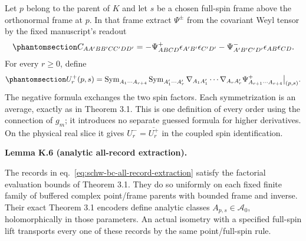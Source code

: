 \documentclass[
  english,
  11pt,
  reqno]{amsart}
\makeatletter
\newcommand{\pandocstatementheading}[1]{%
  \par\addpenalty{\@beginparpenalty}%
  \addvspace{.5\baselineskip plus .2\baselineskip minus .2\baselineskip}%
  {\normalfont\bfseries #1\par}%
  \nobreak\@afterindenttrue\@afterheading
}
\makeatother
\begin{document}
Let \(p\) belong to the parent of \(K\) and let \(s\) be a chosen
full-spin frame above the orthonormal frame at \(p\). In that frame
extract \(\Psi^\pm\) from the covariant Weyl tensor by the fixed
manuscript's readout
\begin{equation}\protect\phantomsection\label{eq:schw-bc-spin-readout}{
 C_{AA'BB'CC'DD'}
 =-\Psi^+_{ABCD}\epsilon_{A'B'}\epsilon_{C'D'}
  -\Psi^-_{A'B'C'D'}\epsilon_{AB}\epsilon_{CD}.
}\end{equation} For every \(r\ge0\), define
\begin{equation}\protect\phantomsection\label{eq:schw-bc-all-record-extraction}{
 U_r^+(p,s)=\operatorname{Sym}_{A_1\cdots A_{r+4}}
 \operatorname{Sym}_{A'_1\cdots A'_r}
 \nabla_{A_1A'_1}\cdots\nabla_{A_rA'_r}
 \Psi^+_{A_{r+1}\cdots A_{r+4}}\big|_{(p,s)}.
}\end{equation} The negative formula exchanges the two spin factors.
Each symmetrization is an average, exactly as in Theorem 3.1. This is
one definition of every order using the connection of \(g_m\); it
introduces no separate guessed formula for higher derivatives. On the
physical real slice it gives \(U^-_r=\overline{U^+_r}\) in the coupled
spin identification.

\pandocstatementheading{\protect{}\label{lem:schw-bc-record-family}Lemma K.6 (analytic all-record extraction).}

The records in eq.~\ref{eq:schw-bc-all-record-extraction} satisfy the
factorial evaluation bounds of Theorem 3.1. They do so uniformly on each
fixed finite family of buffered complex point/frame parents with bounded
frame and inverse. Their exact Theorem 3.1 encoders define analytic
classes \(A_{p,s}\in\mathcal A_0\), holomorphically in those parameters.
An actual isometry with a specified full-spin lift transports every one
of these records by the same point/full-spin rule.
\end{document}
